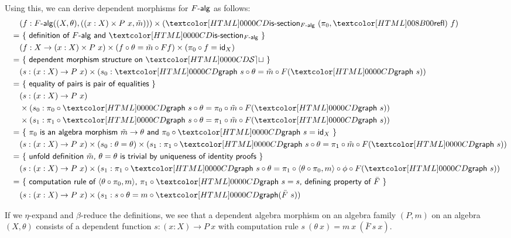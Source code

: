 Using this, we can derive dependent morphisms for $\algcat{F}$ as
follows:
\begin{align*}
  &&&(f : \algcat{F}((X,\theta),((x : X) \times P\ x , \tilde{m}))) \times (\issection_{\algcat{F}}\ (\pi_0, \refl)\ f) \\
  &&=&\ \reasontext{definition of $\algcat{F}$ and $\issection_{\algcat{F}}$} \\
  &&&(f : X \to (x : X) \times P\ x) \times (f \circ \theta = \tilde{m} \circ Ff) \times (\pi_0 \circ f = \id_X) \\
  &&=&\ \reasontext{dependent morphism structure on $\SET$} \\
  &&&(s : (x : X) \to P\ x) \times (s_0 : \grph\ s \circ \theta = \tilde{m} \circ F (\grph\ s)) \\
  &&=&\ \reasontext{equality of pairs is pair of equalities} \\
  &&&(s : (x : X) \to P\ x) \\
  &&&\times (s_0 : \pi_0 \circ \grph\ s \circ \theta = \pi_0 \circ \tilde{m} \circ F (\grph\ s)) \\
  &&&\times (s_1 : \pi_1 \circ \grph\ s \circ \theta = \pi_1 \circ \tilde{m} \circ F (\grph\ s)) \\
  &&=&\ \reasontext{$\pi_0$ is an algebra morphism $\tilde{m} \to \theta$ and $\pi_0 \circ \grph\ s = \id_X$} \\
  &&&(s : (x : X) \to P\ x) \times (s_0 : \theta = \theta) \times (s_1 : \pi_1 \circ \grph\ s \circ \theta = \pi_1 \circ \tilde{m} \circ F (\grph\ s))  \\
  &&=&\ \reasontext{unfold definition $\tilde{m}$, $\theta = \theta$ is trivial by uniqueness of identity proofs} \\
  &&&(s : (x : X) \to P\ x) \times (s_1 : \pi_1 \circ \grph\ s \circ \theta = \pi_1 \circ \langle \theta \circ \pi_0 , m \rangle \circ \phi \circ F (\grph\ s)) \\
  &&=&\ \reasontext{computation rule of $\langle \theta \circ \pi_0 , m \rangle$, $\pi_1 \circ \grph\ s = s$, defining property of $\bar{F}$} \\
  &&&(s : (x : X) \to P\ x) \times (s_1 : s \circ \theta = m \circ \grph (\bar{F}\ s))
\end{align*}

If we $\eta$-expand and $\beta$-reduce the definitions, we see that a
dependent algebra morphism on an algebra family $(P,m)$ on an algebra
$(X,\theta)$ consists of a dependent function $s : (x : X) \to P\ x$
with computation rule $s\ (\theta\ x) = m\ x\ (\bar{F}\ s\ x)$.

